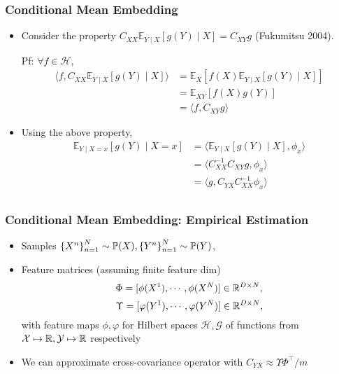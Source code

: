 \documentclass{beamer}
\begin{document}
\begin{frame}
\frametitle{Conditional Mean Embedding}
\begin{itemize}
\item Consider the property $C_{XX}\mathbb{E}_{Y\mid X}[g(Y)\mid X] = C_{XY}g$ (Fukumitsu 2004).

Pf: $\forall f \in \mathscr{H}$,
\begin{align*}
\langle f, C_{XX}\mathbb{E}_{Y\mid X}[g(Y)\mid X] \rangle
&= \mathbb{E}_{X}[f(X) \mathbb{E}_{Y \mid X}[g(Y) \mid X]]\\
&= \mathbb{E}_{XY}[f(X) g(Y)]\\
&= \langle f, C_{XY}g\rangle
\end{align*}
\item Using the above property,
\begin{align*}
\mathbb{E}_{Y\mid X=x}[g(Y)\mid X=x]
&= \langle \mathbb{E}_{Y\mid X}[g(Y)\mid X], \phi_x\rangle\\
&= \langle C_{XX}^{-1}C_{XY}g, \phi_x\rangle\\
&= \langle g, C_{YX}C_{XX}^{-1}\phi_x\rangle\\
\end{align*}
\end{itemize}
\end{frame}

\begin{frame}
\frametitle{Conditional Mean Embedding: Empirical Estimation}
\begin{itemize}
\item Samples $\left\{X^n\right\}_{n=1}^N\sim \mathbb{P}(X), \left\{Y^n\right\}_{n=1}^N\sim \mathbb{P}(Y)$,
\item Feature matrices (assuming finite feature dim)
$$\Phi= [\phi(X^1), \cdots, \phi(X^N)] \in \mathbb{R}^{D\times N},$$
$$\Upsilon= [\varphi(Y^1), \cdots, \varphi(Y^N)] \in \mathbb{R}^{D\times N},$$
with feature maps $\phi,\varphi$ for Hilbert spaces $\mathscr{H},\mathscr{G}$
of functions from $\mathcal{X}\mapsto\mathbb{R},\mathcal{Y}\mapsto\mathbb{R}$ respectively
\item We can approximate cross-covariance operator with
$C_{YX} \approx \Upsilon\Phi^\top / m$
\end{itemize}
\end{frame}
\end{document}
